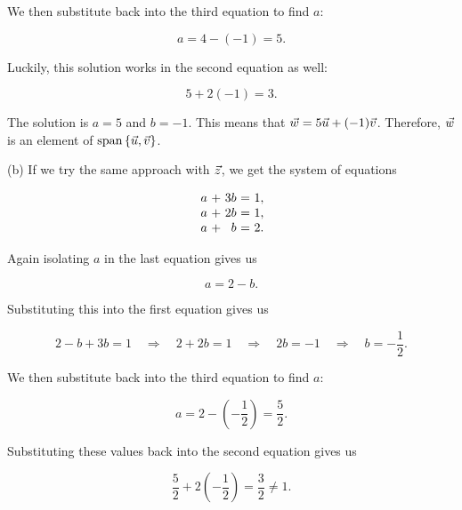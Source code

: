 \documentclass{ximera}
\begin{document}
\begin{exploration}
\begin{example}
\begin{solution}
    We then substitute back into the third equation to find $a$:

    \begin{equation*}
      a = 4 - (-1) = 5.
    \end{equation*}

    Luckily, this solution works in the second equation as well:

    \begin{equation*}
      5 + 2(-1) = 3.
    \end{equation*}
  
    The solution is $a=5$ and $b=-1$. This means that
    $\vec{w} = 5\vec{u} + (-1)\vec{v}$. Therefore, $\vec{w}$ is an
    element of $\text{span}\left\{\vec{u},\vec{v}\right\}$.
  
    (b) If we try the same approach with $\vec{z}$, we get the system of equations
  
    \begin{equation*}
      \begin{array}{r@{~}c@{~}r@{~}c@{~}r@{~}r}
        a & + & 3b & = & 1, \\
        a & + & 2b & = & 1, \\
        a & + & b & = & 2.
      \end{array}
    \end{equation*}

    Again isolating $a$ in the last equation gives us

    \begin{equation*}
      a = 2 - b.
    \end{equation*}

    Substituting this into the first equation gives us

    \begin{equation*}
      2 - b + 3b = 1 \quad \Rightarrow \quad 2 + 2b = 1 \quad \Rightarrow \quad 2b = -1 \quad \Rightarrow \quad b = -\frac{1}{2}.
    \end{equation*}

    We then substitute back into the third equation to find $a$:

    \begin{equation*}
      a = 2 - \left(-\frac{1}{2}\right) = \frac{5}{2}.
    \end{equation*}

    Substituting these values back into the second equation gives us

    \begin{equation*}
      \frac{5}{2} + 2\left(-\frac{1}{2}\right) = \frac{3}{2}\neq 1.
    \end{equation*}


\end{solution}
\end{example}
\end{exploration}
\end{document}
